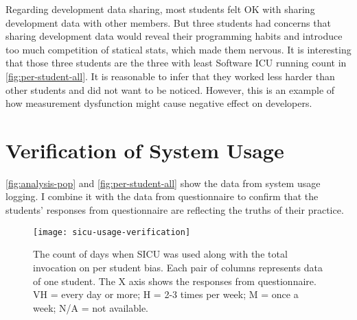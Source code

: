 Regarding development data sharing, most students felt OK with sharing development data with other members. But three students had concerns that sharing development data would reveal their programming habits and introduce too much competition of statical stats, which made them nervous. It is interesting that those three students are the three with least Software ICU running count in \autoref{fig:per-student-all}. It is reasonable to infer that they worked less harder than other students and did not want to be noticed. However, this is an example of how measurement dysfunction might cause negative effect on developers.

\section {Verification of System Usage}

\autoref{fig:analysis-pop} and \autoref{fig:per-student-all} show the data from system usage logging. I combine it with the data from questionnaire to confirm that the students' responses from questionnaire are reflecting the truths of their practice. 

\begin{figure}[htbp] %
   \centering
   \texttt{[image: sicu-usage-verification]} 
   \caption{The count of days when SICU was used along with the total invocation on per student bias. Each pair of columns represents data of one student. The X axis shows the responses from questionnaire. VH = every day or more; H = 2-3 times per week; M = once a week; N/A = not available.}
   \label{fig:sicu-usage-verification}
\end{figure}


